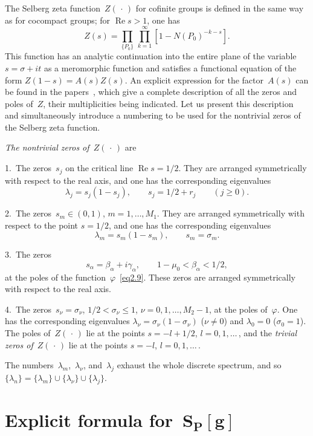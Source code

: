 \documentclass{amsart}
\theoremstyle{plain}
\theoremstyle{definition}
\numberwithin{equation}{section}
\begin{document}
The Selberg zeta function~$Z(\,\cdot\,)$ for cofinite groups is
defined in the same way as for cocompact groups; for
$\operatorname{Re}s>1$, one has
$$
Z(s)=\prod_{\{P_0\}}\,\prod_{k=1}^\infty[1-N(P_0)^{-k-s}].
$$
This function has an analytic continuation into the entire plane of
the variable $s=\sigma+it$ as a meromorphic function and satisfies
a functional equation of the form $Z(1-s)=A(s)Z(s)$. An explicit
expression for the factor~$A(s)$ can be found in the
papers~\cite{1,12}, which give a complete description of all the
zeros and poles of~$Z$, their multiplicities being indicated. Let
us present this description and simultaneously introduce a
numbering to be used for the nontrivial zeros of the Selberg zeta
function.

\textit{The nontrivial zeros of~$Z(\,\cdot\,)$} are

1.~The zeros~$s_j$ on the critical line $\operatorname{Re}s=1/2$.
They are arranged symmetrically with respect to the real axis, and
one has the corresponding eigenvalues
$$
\lambda_j=s_j(1-s_j),\qquad s_j=1/2+r_j\qquad (j\geqslant0).
$$

2.~The zeros~$s_m\in(0,1)$, $m=1,\dots,M_1$. They are arranged
symmetrically with respect to the point $s=1/2$, and one has the
corresponding eigenvalues
$$
\lambda_m=s_m(1-s_m),\qquad s_m=\sigma_m.
$$

3.~The zeros
$$
s_\alpha=\beta_\alpha+i\gamma_\alpha,\qquad
1-\mu_0<\beta_\alpha<1/2,
$$
at the poles of the function~$\varphi$~\eqref{eq2.9}. These zeros
are arranged symmetrically with respect to the real axis.

4.~The zeros~$s_\nu=\sigma_\nu$, $1/2<\sigma_\nu\leqslant1$,
$\nu=0,1,\dots,M_2-1$, at the poles of~$\varphi$. One has the
corresponding eigenvalues $\lambda_\nu=\sigma_\nu(1-\sigma_\nu)$
($\nu\ne0$) and $\lambda_0=0$ ($\sigma_0=1$). The poles
of~$Z(\,\cdot\,)$ lie at the points $s=-l+1/2$, $l=0,1,\dots$\,,
and the \textit{trivial zeros of~$Z(\,\cdot\,)$} lie at the points
$s=-l$, $l=0,1,\dots$\,.

The numbers~$\lambda_m$,~$\lambda_\nu$, and~$\lambda_j$ exhaust the
whole discrete spectrum, and so
$\{\lambda_n\}=\{\lambda_m\}\cup\{\lambda_\nu\}\cup\{\lambda_j\}$.





\section{Explicit formula for~$\boldsymbol{S_P[g]}$}
\label{sec3}
\end{document}
